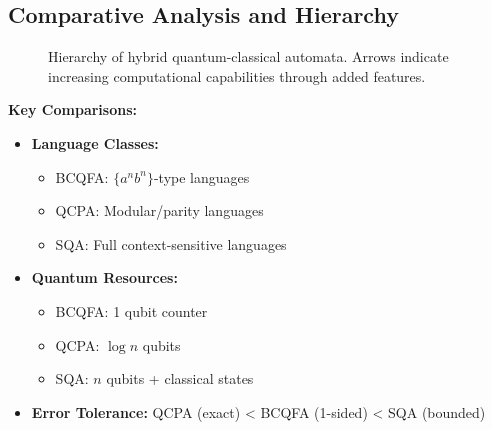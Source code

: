 \subsection*{Comparative Analysis and Hierarchy}
\begin{figure}[h]
\centering
{}
\caption{Hierarchy of hybrid quantum-classical automata. Arrows indicate increasing computational capabilities through added features.}
\label{fig:hybrid-hierarchy}
\end{figure}

\textbf{Key Comparisons:}
\begin{itemize}
    \item \textbf{Language Classes:}
    \begin{itemize}
        \item BCQFA: $\{a^nb^n\}$-type languages
        \item QCPA: Modular/parity languages
        \item SQA: Full context-sensitive languages
    \end{itemize}
    \item \textbf{Quantum Resources:}
    \begin{itemize}
        \item BCQFA: 1 qubit counter
        \item QCPA: $\log n$ qubits
        \item SQA: $n$ qubits + classical states
    \end{itemize}
    \item \textbf{Error Tolerance:} QCPA (exact) < BCQFA (1-sided) < SQA (bounded)
\end{itemize}